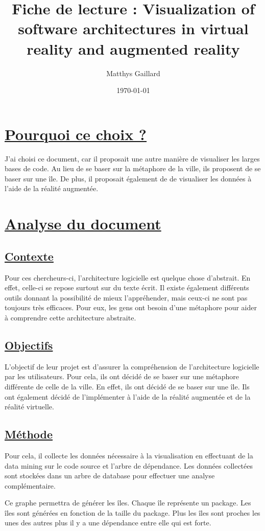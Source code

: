 \documentclass[a4paper,10pt, oneside]{article}
\title{Fiche de lecture : Visualization of software architectures in virtual reality and augmented reality}
\author{Matthys Gaillard}
\date{\today}
\newcommand{\li}{\newline}
\begin{document}
\maketitle
\section{\ul{Pourquoi ce choix ?}}
        \par J'ai choisi ce document\cite{A1}, car il proposait une autre manière de visualiser les larges bases de code. Au lieu de se 
        baser sur la métaphore de la ville, ils proposent de se baser sur une île. De plus, il proposait également de de visualiser les données
        à l'aide de la réalité augmentée.
\section{\ul{Analyse du document}}
\subsection{\ul{Contexte}}
        \par Pour ces chercheurs-ci, l'architecture logicielle est quelque chose d'abstrait. En effet, celle-ci se repose surtout sur du texte écrit.
        Il existe également différents outils donnant la possibilité de mieux l'appréhender, mais ceux-ci ne sont pas toujours très efficaces.
        Pour eux, les gens ont besoin d'une métaphore pour aider à comprendre cette architecture abstraite.
\subsection{\ul{Objectifs}}
        \par L'objectif de leur projet est d'assurer la compréhension de l'architecture logicielle par les utilisateurs. Pour cela, ils ont décidé
        de se baser sur une métaphore différente de celle de la ville. En effet, ils ont décidé de se baser sur une île. Ils ont également décidé
        de l'implémenter à l'aide de la réalité augmentée et de la réalité virtuelle. 
\subsection{\ul{Méthode}}
        \par Pour cela, il collecte les données nécessaire à la visualisation en effectuant de la data mining sur le code source et l'arbre de dépendance.
        Les données collectées sont stockées dans un arbre de database pour effectuer une analyse complémentaire.\li
        \par Ce graphe permettra de générer les îles. Chaque île représente un package. Les îles sont générées en fonction de la taille du package.
        Plus les îles sont proches les unes des autres plus il y a une dépendance entre elle qui est forte.
\end{document}
